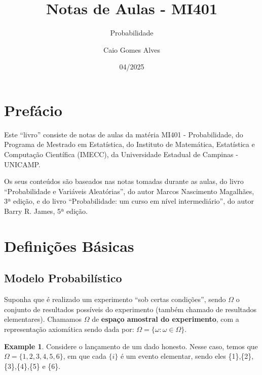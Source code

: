 \documentclass[
]{article}
\title{Notas de Aulas - MI401}
\subtitle{Probabilidade}
\author{Caio Gomes Alves}
\date{04/2025}
\theoremstyle{definition}
\theoremstyle{definition}
\newtheorem{example}{Example}[section]
\theoremstyle{definition}
\theoremstyle{definition}
\theoremstyle{remark}
\begin{document}
\maketitle

\renewcommand*\contentsname{Conteúdos}
{
\setcounter{tocdepth}{2}
\tableofcontents
}
\newpage

\hypertarget{prefuxe1cio}{%
\section{Prefácio}\label{prefuxe1cio}}

Este ``livro'' consiste de notas de aulas da matéria MI401 - Probabilidade, do Programa de Mestrado em Estatística, do Instituto de Matemática, Estatística e Computação Científica (IMECC), da Universidade Estadual de Campinas - UNICAMP.

Os seus conteúdos são baseados nas notas tomadas durante as aulas, do livro ``Probabilidade e Variáveis Aleatórias'', do autor Marcos Nascimento Magalhães, 3ª edição, e do livro ``Probabilidade: um curso em nível intermediário'', do autor Barry R. James, 5ª edição.

\newpage

\hypertarget{definiuxe7uxf5es-buxe1sicas}{%
\section{Definições Básicas}\label{definiuxe7uxf5es-buxe1sicas}}

\hypertarget{modelo-probabiluxedstico}{%
\subsection{Modelo Probabilístico}\label{modelo-probabiluxedstico}}

Suponha que é realizado um experimento ``sob certas condições'', sendo \textbf{\(\Omega\)} o conjunto de resultados possíveis do experimento (também chamado de resultados elementares). Chamamos \textbf{\(\Omega\)} de \textbf{espaço amostral do experimento}, com a representação axiomática sendo dada por: \(\Omega = \{\omega : \omega \in \Omega\}\).

\begin{example}
Considere o lançamento de um dado honesto. Nesse caso, temos que \(\Omega = \{1,2,3,4,5,6\}\), em que cada \(\{i\}\) é um evento elementar, sendo eles \{1\},\{2\},\{3\},\{4\},\{5\} e \{6\}.
\end{example}
\end{document}
